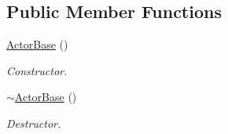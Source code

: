 \subsection*{Public Member Functions}
\begin{DoxyCompactItemize}
\item 
\hypertarget{classContent_1_1Actor_1_1Physics_1_1PhysX_1_1ActorBase_a3a82472c983a641a8a51ca2fe81166cd}{
\hyperlink{classContent_1_1Actor_1_1Physics_1_1PhysX_1_1ActorBase_a3a82472c983a641a8a51ca2fe81166cd}{ActorBase} ()}
\label{classContent_1_1Actor_1_1Physics_1_1PhysX_1_1ActorBase_a3a82472c983a641a8a51ca2fe81166cd}

\begin{DoxyCompactList}\small\item\em Constructor. \item\end{DoxyCompactList}\item 
\hypertarget{classContent_1_1Actor_1_1Physics_1_1PhysX_1_1ActorBase_a1d4ad7929248bdfe9dc4ab8b3f5abb24}{
\hyperlink{classContent_1_1Actor_1_1Physics_1_1PhysX_1_1ActorBase_a1d4ad7929248bdfe9dc4ab8b3f5abb24}{$\sim$ActorBase} ()}
\label{classContent_1_1Actor_1_1Physics_1_1PhysX_1_1ActorBase_a1d4ad7929248bdfe9dc4ab8b3f5abb24}

\begin{DoxyCompactList}\small\item\em Destructor. \item\end{DoxyCompactList}\end{DoxyCompactItemize}
